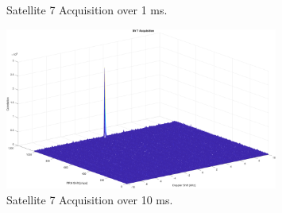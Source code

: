 \documentclass[10pt]{article}
\begin{document}
\begin{enumerate}[label=\textbf{\arabic*.}]
\begin{figure}[h]
    \caption{Satellite 7 Acquisition over 1 ms.}
    \label{fig:9}
  \end{figure}
  \begin{figure}[h]
    \centering
    \includegraphics[width=0.8\textwidth]{p7_SV7_2.png}
    \caption{Satellite 7 Acquisition over 10 ms.}
    \label{fig:10}
  \end{figure}

\end{enumerate}
\end{document}
